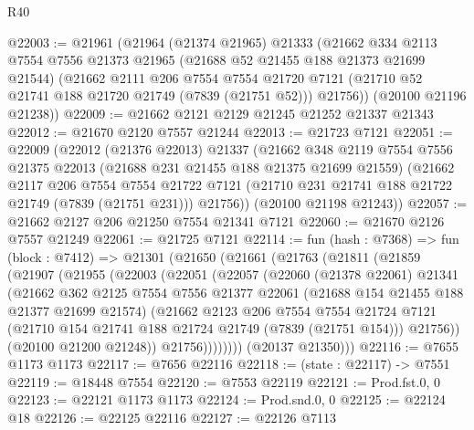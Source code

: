 \begin{lexlean}{R40}
\begin{coremodule}
@22003 := @21961
    (@21964
      (@21374 @21965)
      @21333
      (@21662
        @334
        @2113
        @7554
        @7556
        @21373
        @21965
        (@21688 @52 @21455 @188 @21373 @21699 @21544)
        (@21662
          @2111
          @206
          @7554
          @7554
          @21720
          @7121
          (@21710 @52 @21741 @188 @21720 @21749 (@7839 (@21751 @52)))
          @21756))
      (@20100 @21196 @21238))
@22009 := @21662 @2121 @2129 @21245 @21252 @21337 @21343
@22012 := @21670 @2120 @7557 @21244
@22013 := @21723 @7121
@22051 := @22009
    (@22012
      (@21376 @22013)
      @21337
      (@21662
        @348
        @2119
        @7554
        @7556
        @21375
        @22013
        (@21688 @231 @21455 @188 @21375 @21699 @21559)
        (@21662
          @2117
          @206
          @7554
          @7554
          @21722
          @7121
          (@21710 @231 @21741 @188 @21722 @21749 (@7839 (@21751 @231)))
          @21756))
      (@20100 @21198 @21243))
@22057 := @21662 @2127 @206 @21250 @7554 @21341 @7121
@22060 := @21670 @2126 @7557 @21249
@22061 := @21725 @7121
@22114 := fun (hash : @7368) =>
  fun (block : @7412) =>
  @21301
    (@21650
      (@21661
        (@21763
          (@21811
            (@21859
              (@21907
                (@21955
                  (@22003
                    (@22051
                      (@22057
                        (@22060
                          (@21378 @22061)
                          @21341
                          (@21662
                            @362
                            @2125
                            @7554
                            @7556
                            @21377
                            @22061
                            (@21688 @154 @21455 @188 @21377 @21699 @21574)
                            (@21662
                              @2123
                              @206
                              @7554
                              @7554
                              @21724
                              @7121
                              (@21710 @154 @21741 @188 @21724 @21749 (@7839 (@21751 @154)))
                              @21756))
                          (@20100 @21200 @21248))
                        @21756))))))))
        (@20137 @21350)))
@22116 := @7655 @1173 @1173
@22117 := @7656 @22116
@22118 := (state : @22117) -> @7551
@22119 := @18448 @7554
@22120 := @7553 @22119
@22121 := Prod.fst.{0, 0}
@22123 := @22121 @1173 @1173
@22124 := Prod.snd.{0, 0}
@22125 := @22124 @18
@22126 := @22125 @22116
@22127 := @22126 @7113

\end{coremodule}
\end{lexlean}
